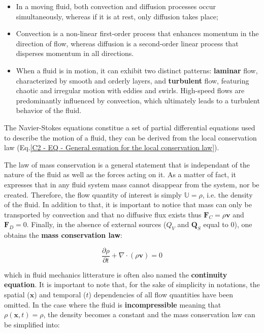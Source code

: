 \begin{itemize}
	\item In a moving fluid, both convection and diffusion processes occur simultaneously, whereas if it is at rest, only diffusion takes place;
	
	\item Convection is a non-linear first-order process that enhances momentum in the direction of flow, whereas diffusion is a second-order linear process that disperses momentum in all directions.
	
		\item When a fluid is in motion, it can exhibit two distinct patterns: \textbf{laminar} flow, characterized by smooth and orderly layers, and \textbf{turbulent} flow, featuring chaotic and irregular motion with eddies and swirls. High-speed flows are predominantly influenced by convection, which ultimately leads to a turbulent behavior of the fluid.
	
\end{itemize}

\newpage


The Navier-Stokes equations constitue a set of partial differential equations used to describe the motion of a fluid, they can be derived from the local conservation law (Eq.\ref{C2 - EQ - General equation for the local conservation law}).



The law of mass conservation is a general statement that is independant of the nature of the fluid as well as the forces acting on it. As a matter of fact, it expresses that in any fluid system mass cannot disappear from the system, nor be created. Therefore, the flow quantity of interest is simply $\mathbb{U} = \rho$, i.e. the density of the fluid. In addition to that, it is important to notice that mass can only be transported by convection and that no diffusive flux exists thus $\mathbf{F}_C = \rho \mathbf{v}$ and $\mathbf{F}_D = 0$. Finally, in the absence of external sources ($Q_V$ and $\mathbf{Q}_S$ equal to 0), one obtains the \textbf{mass conservation law}:

\begin{equation*}
	\frac{\partial \rho}{\partial t}+\nabla \cdot(\rho \mathbf{v})=0
\end{equation*}
\vspace{-0.2em}

which in fluid mechanics litterature is often also named the \textbf{continuity equation}. It is important to note that, for the sake of simplicity in notations, the spatial ($\mathbf{x}$) and temporal ($t$) dependencies of all flow quantities have been omitted. In the case where the fluid is \textbf{incompressible} meaning that $\rho(\mathbf{x}, t) = \rho$, the density becomes a constant and the mass conservation law can be simplified into:

